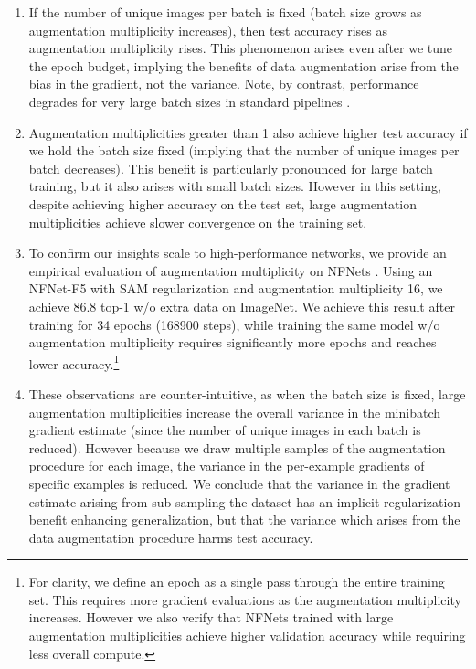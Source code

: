\documentclass{article}
\begin{document}
\begin{enumerate}
    \item If the number of unique images per batch is fixed (batch size grows as augmentation multiplicity increases), then test accuracy rises as augmentation multiplicity rises. This phenomenon arises even after we tune the epoch budget, implying the benefits of data augmentation arise from the bias in the gradient, not the variance. Note, by contrast, performance degrades for very large batch sizes in standard pipelines \citep{smith2020generalization}.
    
    \item Augmentation multiplicities greater than 1 also achieve higher test accuracy if we hold the batch size fixed (implying that the number of unique images per batch decreases). This benefit is particularly pronounced for large batch training, but it also arises with small batch sizes. However in this setting, despite achieving higher accuracy on the test set, large augmentation multiplicities achieve slower convergence on the training set. 

    \item To confirm our insights scale to high-performance networks, we provide an empirical evaluation of augmentation multiplicity on NFNets \citep{brock2021high}. Using an NFNet-F5 with SAM regularization and augmentation multiplicity 16, we achieve 86.8 top-1 w/o extra data on ImageNet. We achieve this result after training for 34 epochs (168900 steps), while training the same model w/o augmentation multiplicity requires significantly more epochs and reaches lower accuracy.\footnote{For clarity, we define an epoch as a single pass through the entire training set. This requires more gradient evaluations as the augmentation multiplicity increases. However we also verify that NFNets trained with large augmentation multiplicities achieve higher validation accuracy while requiring less overall compute.} 
    
    \item These observations are counter-intuitive, as when the batch size is fixed, large augmentation multiplicities increase the overall variance in the minibatch gradient estimate (since the number of unique images in each batch is reduced). However because we draw multiple samples of the augmentation procedure for each image, the variance in the per-example gradients of specific examples is reduced. We conclude that the variance in the gradient estimate arising from sub-sampling the dataset has an implicit regularization benefit enhancing generalization, but that the variance which arises from the data augmentation procedure harms test accuracy.
    

\end{enumerate}
\end{document}
